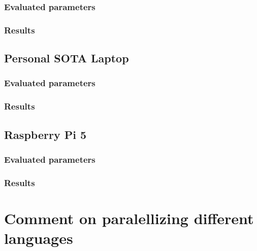 \subsubsection{Evaluated parameters}
\subsubsection{Results}

\subsection{Personal SOTA Laptop}
\subsubsection{Evaluated parameters}
\subsubsection{Results}

\subsection{Raspberry Pi 5}
\subsubsection{Evaluated parameters}
\subsubsection{Results}


\section{Comment on paralellizing different languages}





